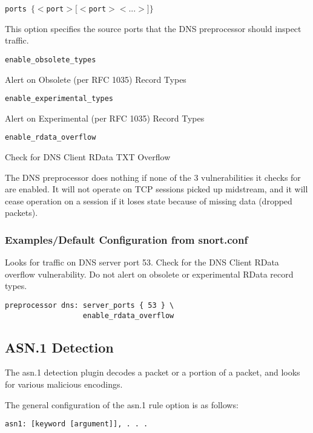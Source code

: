 \documentclass[english]{report}
\newcounter{slistnum}
\newenvironment{slist}
{ \begin{list}{ {\bf \arabic{slistnum}.} }{\usecounter{slistnum} } }
{ \end{list} }
\begin{document}
\begin{slist}

\item \texttt{ports $\{ <$port$> [<$port$> <...>] \}$}

This option specifies the source ports that the DNS preprocessor should
inspect traffic.

\item \texttt{enable\_obsolete\_types}

Alert on Obsolete (per RFC 1035) Record Types

\item \texttt{enable\_experimental\_types}

Alert on Experimental (per RFC 1035) Record Types

\item \texttt{enable\_rdata\_overflow}

Check for DNS Client RData TXT Overflow

\end{slist}

The DNS preprocessor does nothing if none of the 3 vulnerabilities
it checks for are enabled.  It will not operate on TCP sessions
picked up midstream, and it will cease operation on a session if it
loses state because of missing data (dropped packets).

\subsubsection{Examples/Default Configuration from snort.conf}

Looks for traffic on DNS server port 53.  Check for the DNS Client RData
overflow vulnerability.  Do not alert on obsolete or experimental RData
record types.

\begin{verbatim}
preprocessor dns: server_ports { 53 } \
                  enable_rdata_overflow
\end{verbatim}

\subsection{ASN.1 Detection\label{asn1}}

The asn.1 detection plugin decodes a packet or a portion of a packet, and looks
for various malicious encodings.

The general configuration of the asn.1 rule option is as follows:

\begin{verbatim}
asn1: [keyword [argument]], . . . 
\end{verbatim}
\end{document}
